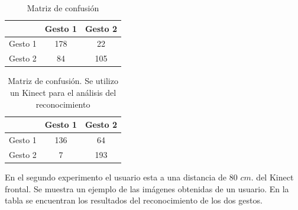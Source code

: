 
\begin{table}[h!] 
\begin{center}
\begin{tabular}{ r || c | c |} 
 
        & Gesto 1 & Gesto 2 \\ \hline \hline  
Gesto 1 & 178    &  22     \\ \hline  
Gesto 2 & 84     & 105     \\   

\end{tabular}
\end{center} 
\caption{Matriz de confusión}
\end{table}


\begin{table}[h!] 
\begin{center}
\begin{tabular}{ r || c | c |} 
 
        & Gesto 1 & Gesto 2 \\ \hline \hline  
Gesto 1 & 136    &  64     \\ \hline  
Gesto 2 & 7     &  193     \\   

\end{tabular}
\end{center} 
\caption{Matriz de confusión. Se utilizo un Kinect para el análisis del reconocimiento}
\end{table}


En el segundo experimento el usuario esta a una distancia de $80$ $cm.$ del Kinect frontal. Se muestra un ejemplo de las imágenes obtenidas de un usuario. En la tabla se encuentran los resultados del reconocimiento de los dos gestos.   


